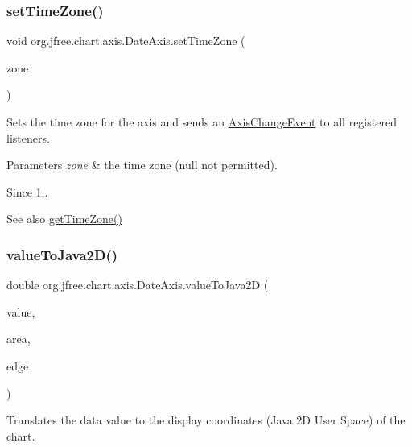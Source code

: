 \subsubsection{\texorpdfstring{set\+Time\+Zone()}{setTimeZone()}}
{\footnotesize\ttfamily void org.\+jfree.\+chart.\+axis.\+Date\+Axis.\+set\+Time\+Zone (\begin{DoxyParamCaption}\item[{Time\+Zone}]{zone }\end{DoxyParamCaption})}

Sets the time zone for the axis and sends an \mbox{\hyperlink{}{Axis\+Change\+Event}} to all registered listeners.


\begin{DoxyParams}{Parameters}
{\em zone} & the time zone ({\ttfamily null} not permitted).\\
\hline
\end{DoxyParams}
\begin{DoxySince}{Since}
1..
\end{DoxySince}
\begin{DoxySeeAlso}{See also}
\mbox{\hyperlink{classorg_1_1jfree_1_1chart_1_1axis_1_1_date_axis_a93837dafa9a6141a5c995a5c2b40f936}{get\+Time\+Zone()}} 
\end{DoxySeeAlso}
\mbox{\label{classorg_1_1jfree_1_1chart_1_1axis_1_1_date_axis_a3f62ad97be559de5c42dae00a07af40d}} 
\subsubsection{\texorpdfstring{value\+To\+Java2\+D()}{valueToJava2D()}}
{\footnotesize\ttfamily double org.\+jfree.\+chart.\+axis.\+Date\+Axis.\+value\+To\+Java2D (\begin{DoxyParamCaption}\item[{double}]{value,  }\item[{Rectangle2D}]{area,  }\item[{Rectangle\+Edge}]{edge }\end{DoxyParamCaption})}

Translates the data value to the display coordinates (Java 2D User Space) of the chart.


